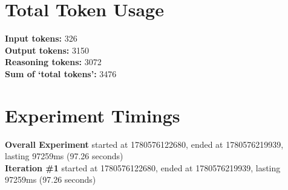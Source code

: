 \documentclass{article}
\begin{document}
\section*{Total Token Usage}
\textbf{Input tokens: }326
\\\textbf{Output tokens: }3150
\\\textbf{Reasoning tokens: }3072
\\\textbf{Sum of `total tokens': }3476
\section*{Experiment Timings}
\textbf{Overall Experiment} started at 1780576122680, ended at 1780576219939, lasting 97259ms (97.26 seconds)
\\\textbf{Iteration \#1} started at 1780576122680, ended at 1780576219939, lasting 97259ms (97.26 seconds)
\end{document}
